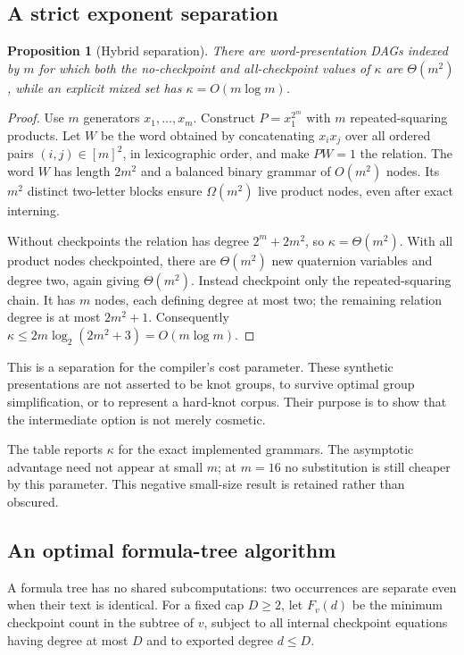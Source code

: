 \documentclass[11pt]{article}
\newtheorem{proposition}[theorem]{Proposition}
\theoremstyle{definition}
\theoremstyle{remark}
\begin{document}
\subsection{A strict exponent separation}
\begin{proposition}[Hybrid separation]
\label{prop:hybrid}
There are word-presentation DAGs indexed by $m$ for which both the no-checkpoint and all-checkpoint values of $\kappa$ are $\Theta(m^2)$, while an explicit mixed set has $\kappa=O(m\log m)$.
\end{proposition}
\begin{proof}
Use $m$ generators $x_1,\ldots,x_m$. Construct $P=x_1^{2^m}$ with $m$ repeated-squaring products. Let $W$ be the word obtained by concatenating $x_i x_j$ over all ordered pairs $(i,j)\in[m]^2$, in lexicographic order, and make $PW=1$ the relation. The word $W$ has length $2m^2$ and a balanced binary grammar of $O(m^2)$ nodes. Its $m^2$ distinct two-letter blocks ensure $\Omega(m^2)$ live product nodes, even after exact interning.

Without checkpoints the relation has degree $2^m+2m^2$, so $\kappa=\Theta(m^2)$. With all product nodes checkpointed, there are $\Theta(m^2)$ new quaternion variables and degree two, again giving $\Theta(m^2)$. Instead checkpoint only the repeated-squaring chain. It has $m$ nodes, each defining degree at most two; the remaining relation degree is at most $2m^2+1$. Consequently $\kappa\le2m\log_2(2m^2+3)=O(m\log m)$.
\end{proof}

This is a separation for the compiler's cost parameter. These synthetic presentations are not asserted to be knot groups, to survive optimal group simplification, or to represent a hard-knot corpus. Their purpose is to show that the intermediate option is not merely cosmetic.

\begin{center}\small

\end{center}
The table reports $\kappa$ for the exact implemented grammars. The asymptotic advantage need not appear at small $m$; at $m=16$ no substitution is still cheaper by this parameter. This negative small-size result is retained rather than obscured.

\subsection{An optimal formula-tree algorithm}
A formula tree has no shared subcomputations: two occurrences are separate even when their text is identical. For a fixed cap $D\ge2$, let $F_v(d)$ be the minimum checkpoint count in the subtree of $v$, subject to all internal checkpoint equations having degree at most $D$ and to exported degree $d\le D$.
\end{document}
